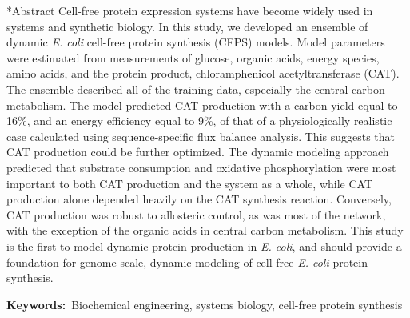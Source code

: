 \documentclass[12pt]{article}
\makeatletter
\renewcommand\section{\@startsection
	{subsection}{2}{0mm}
	{-0.2in}
	{0.05\baselineskip}
	{\normalfont\large\bfseries}}
\makeatother
\begin{document}
\section*{Abstract}
Cell-free protein expression systems have become widely used in systems and synthetic biology.
In this study, we developed an ensemble of dynamic \textit{E. coli} cell-free protein synthesis (CFPS) models.
Model parameters were estimated from measurements of glucose, organic acids, energy species, amino acids, and the protein product, chloramphenicol acetyltransferase (CAT).
The ensemble described all of the training data, especially the central carbon metabolism.
The model predicted CAT production with a carbon yield equal to 16\%, and an energy efficiency equal to 9\%, of that of a physiologically realistic case calculated using sequence-specific flux balance analysis.
This suggests that CAT production could be further optimized.
The dynamic modeling approach predicted that substrate consumption and oxidative phosphorylation were most important to both CAT production and the system as a whole, while CAT production alone depended heavily on the CAT synthesis reaction.
Conversely, CAT production was robust to allosteric control, as was most of the network, with the exception of the organic acids in central carbon metabolism.
This study is the first to model dynamic protein production in \textit{E. coli}, and should provide a foundation for genome-scale, dynamic modeling of cell-free \textit{E. coli} protein synthesis.

\vspace{0.1in}
{\noindent \textbf{Keywords:}~Biochemical engineering, systems biology, cell-free protein synthesis}

\pagebreak

\setcounter{page}{1}


\linenumbers
\end{document}
